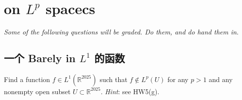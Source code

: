 \documentclass[lang=cn,11pt]{elegantbook}
\begin{document}
\chapter{on $L^p$ spacecs}

\vspace*{5mm}
\begin{center}
\textit{Some of the following questions will be graded. Do them, and do hand them in}.
\end{center}

\section{一个 Barely in $L^1$ 的函数}
Find a function $f\in L^1(\mathbb{R}^{2025})$ such that $f\not\in L^p(U)$ for any $p>1$ and any nonempty open subset $U\subset \mathbb{R}^{2025}$. \textit{Hint}: see HW5(g).
\end{document}
